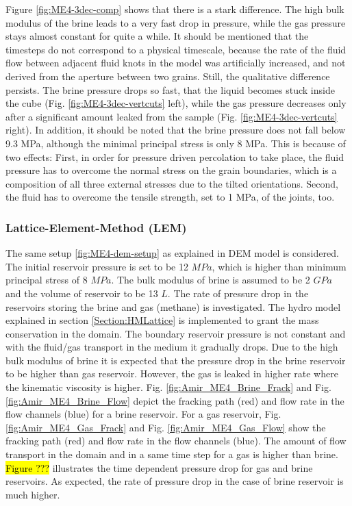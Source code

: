 Figure \ref{fig:ME4-3dec-comp} shows that there is a stark difference. The high bulk modulus of the brine leads to a very fast drop in pressure, while the gas pressure stays almost constant for quite a while. It should be mentioned that the timesteps do not correspond to a physical timescale, because the rate of the fluid flow between adjacent fluid knots in the model was artificially increased, and not derived from the aperture between two grains. Still, the qualitative difference persists. The brine pressure drops so fast, that the liquid becomes stuck inside the cube (Fig. \ref{fig:ME4-3dec-vertcuts} left), while the gas pressure decreases only after a significant amount leaked from the sample (Fig. \ref{fig:ME4-3dec-vertcuts} right). In addition, it should be noted that the brine pressure does not fall below 9.3 MPa, although the minimal principal stress is only 8 MPa. This is because of two effects: First, in order for pressure driven percolation to take place, the fluid pressure has to overcome the normal stress on the grain boundaries, which is a composition of all three external stresses due to the tilted orientations. Second, the fluid has to overcome the tensile strength, set to 1 MPa, of the joints, too. 

\subsubsection*{Lattice-Element-Method (LEM)}

The same setup \ref{fig:ME4-dem-setup} as explained in DEM model is considered. The initial reservoir pressure is set to be 12 $MPa$, which is higher than minimum principal stress of 8 $MPa$.  The bulk modulus of brine is assumed to be 2 $GPa$ and the volume of reservoir to be 13 $L$. The rate of pressure drop in the reservoirs storing the brine and gas (methane) is investigated. The hydro model explained in section \ref{Section:HMLattice} is implemented to grant the mass conservation in the domain. The boundary reservoir pressure is not constant and with the fluid/gas transport in the medium it gradually drops. Due to the high bulk modulus of brine it is expected that the pressure drop in the brine reservoir to be higher than gas reservoir. However, the gas is leaked in higher rate where the kinematic viscosity is higher. Fig. \ref{fig:Amir_ME4_Brine_Frack} and Fig.  \ref{fig:Amir_ME4_Brine_Flow} depict the fracking path (red) and flow rate in the flow channels (blue) for a brine reservoir. For a gas reservoir, Fig. \ref{fig:Amir_ME4_Gas_Frack} and Fig. \ref{fig:Amir_ME4_Gas_Flow} show the fracking path (red) and flow rate in the flow channels (blue). The amount of flow transport in the domain and in a same time step for a gas is higher than brine. \hl{Figure ???} illustrates the time dependent pressure drop for gas and brine reservoirs. As expected, the rate of pressure drop in the case of brine reservoir is much higher.

